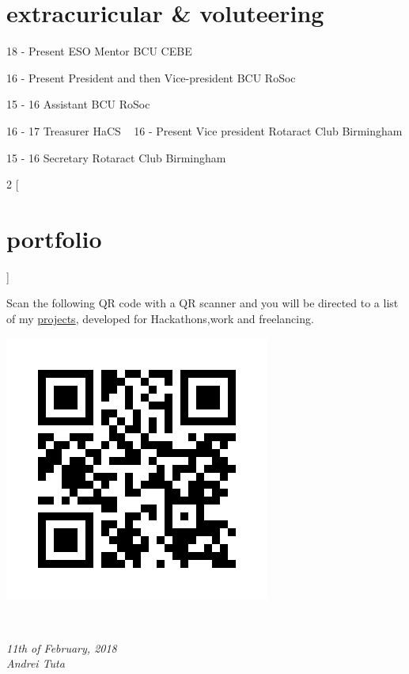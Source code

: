 \documentclass[]{friggeri-cv}
\begin{document}
\section{extracuricular \& voluteering}
\begin{entrylist}
    
    
    \entry
    {18 - Present}
    {ESO Mentor}
    {BCU CEBE}
    
    \entry
    {16 - Present}
    {President and then Vice-president}
    {BCU RoSoc}
    
    \entry
    {15 - 16}
    {Assistant}
    {BCU RoSoc}
    
     \entry
    {16 - 17}
    {Treasurer}
    {HaCS}
    ~ 
     \entry
    {16 - Present}
    {Vice president}
    {Rotaract Club Birmingham}
    
    \entry
    {15 - 16}
    {Secretary}
    {Rotaract Club Birmingham}
    ~
    
\end{entrylist}

\begin{multicols}{2}
[
\section{portfolio}
]

Scan the following QR code with a QR scanner and you will be directed to a list of my 
\hyperref[https://github.com/andreituta/cv]{projects}, developed for Hackathons,work and freelancing.
    
   \begin{flushright}
   \includegraphics[scale=0.30]{img/static_qr_code_without_logo.jpg}
\end{flushright}

   
\end{multicols}
\\
\begin{flushleft}
\emph{11th of February, 2018}
\\
\emph{Andrei Tuta}
\end{flushleft}
\end{document}
